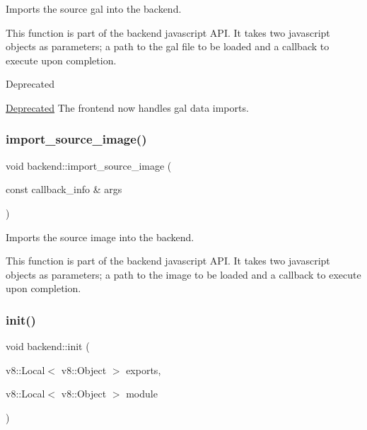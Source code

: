 Imports the source gal into the backend. 

This function is part of the backend javascript A\+PI. It takes two javascript objects as parameters; a path to the gal file to be loaded and a callback to execute upon completion.

\begin{DoxyRefDesc}{Deprecated}
\item[\hyperlink{deprecated__deprecated000001}{Deprecated}]The frontend now handles gal data imports. \end{DoxyRefDesc}
\mbox{\label{classbackend_a516007959f2bc8b4f5f83d1a448a6090}} 
\subsubsection{\texorpdfstring{import\+\_\+source\+\_\+image()}{import\_source\_image()}}
{\footnotesize\ttfamily void backend\+::import\+\_\+source\+\_\+image (\begin{DoxyParamCaption}\item[{const callback\+\_\+info \&}]{args }\end{DoxyParamCaption})\hspace{0.3cm}{\ttfamily [static]}}



Imports the source image into the backend. 

This function is part of the backend javascript A\+PI. It takes two javascript objects as parameters; a path to the image to be loaded and a callback to execute upon completion. \mbox{\label{classbackend_a44ff4b919d81243742ff4b4bedde4f83}} 
\subsubsection{\texorpdfstring{init()}{init()}}
{\footnotesize\ttfamily void backend\+::init (\begin{DoxyParamCaption}\item[{v8\+::\+Local$<$ v8\+::\+Object $>$}]{exports,  }\item[{v8\+::\+Local$<$ v8\+::\+Object $>$}]{module }\end{DoxyParamCaption})\hspace{0.3cm}{\ttfamily [static]}}



